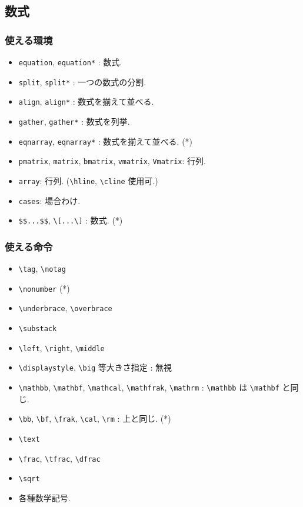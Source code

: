 \documentclass[lualatex,ja=standard,jafont=haranoaji]{bxjsarticle}
\def\dep{(*)}
\begin{document}
\begin{itemize}
\end{itemize}


\subsection{数式}
\subsubsection{使える環境}

\begin{itemize}
\item \verb|equation|, \verb|equation*| : 数式.
\item \verb|split|, \verb|split*| : 一つの数式の分割.
\item \verb|align|, \verb|align*| : 数式を揃えて並べる.
\item \verb|gather|, \verb|gather*| : 数式を列挙.
\item \verb|eqnarray|, \verb|eqnarray*| : 数式を揃えて並べる. \dep

\item \verb|pmatrix|,
  \verb|matrix|,
  \verb|bmatrix|,
  \verb|vmatrix|,
  \verb|Vmatrix|: 行列.
\item \verb|array|: 行列. (\verb|\hline|, \verb|\cline| 使用可.)
\item \verb|cases|: 場合わけ.
\item \verb|$$...$$|, \verb|\[...\]| : 数式. \dep
\end{itemize}
  
\subsubsection{使える命令}

\begin{itemize}
\item \verb|\tag|, \verb|\notag|
\item \verb|\nonumber| \dep
\item \verb|\underbrace|, \verb|\overbrace|
\item \verb|\substack|
\item \verb|\left|, \verb|\right|, \verb|\middle|
\item \verb|\displaystyle|, \verb|\big| 等大きさ指定 : 無視
\item \verb|\mathbb|, \verb|\mathbf|, \verb|\mathcal|, \verb|\mathfrak|, \verb|\mathrm| : \verb|\mathbb| は \verb|\mathbf| と同じ.
\item \verb|\bb|, \verb|\bf|, \verb|\frak|, \verb|\cal|, \verb|\rm| : 上と同じ. \dep
\item \verb|\text|
\item \verb|\frac|, \verb|\tfrac|, \verb|\dfrac|
\item \verb|\sqrt|
\item 各種数学記号.

\end{itemize}
\end{document}
